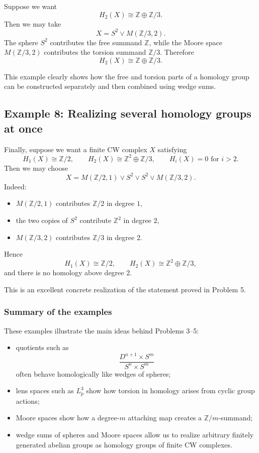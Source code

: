 \documentclass[12pt,a4paper]{article}
\theoremstyle{notespace}
\begin{document}
Suppose we want
\[
H_2(X)\cong \mathbb Z\oplus \mathbb Z/3.
\]
Then we may take
\[
X=S^2\vee M(\mathbb Z/3,2).
\]
The sphere \(S^2\) contributes the free summand \(\mathbb Z\), while the Moore space \(M(\mathbb Z/3,2)\) contributes the torsion summand \(\mathbb Z/3\). Therefore
\[
H_2(X)\cong \mathbb Z\oplus \mathbb Z/3.
\]

This example clearly shows how the free and torsion parts of a homology group can be constructed separately and then combined using wedge sums.

\subsection*{Example 8: Realizing several homology groups at once}

Finally, suppose we want a finite CW complex \(X\) satisfying
\[
H_1(X)\cong \mathbb Z/2,
\qquad
H_2(X)\cong \mathbb Z^2\oplus \mathbb Z/3,
\qquad
H_i(X)=0 \text{ for } i>2.
\]
Then we may choose
\[
X=M(\mathbb Z/2,1)\vee S^2\vee S^2\vee M(\mathbb Z/3,2).
\]
Indeed:
\begin{itemize}
	\item \(M(\mathbb Z/2,1)\) contributes \(\mathbb Z/2\) in degree \(1\),
	\item the two copies of \(S^2\) contribute \(\mathbb Z^2\) in degree \(2\),
	\item \(M(\mathbb Z/3,2)\) contributes \(\mathbb Z/3\) in degree \(2\).
\end{itemize}
Hence
\[
H_1(X)\cong \mathbb Z/2,
\qquad
H_2(X)\cong \mathbb Z^2\oplus \mathbb Z/3,
\]
and there is no homology above degree \(2\).

This is an excellent concrete realization of the statement proved in Problem 5.

\subsubsection*{Summary of the examples}

These examples illustrate the main ideas behind Problems 3--5:
\begin{itemize}
	\item quotients such as
	\[
	\frac{D^{n+1}\times S^m}{S^n\times S^m}
	\]
	often behave homologically like wedges of spheres;
	\item lens spaces such as \(L_p^3\) show how torsion in homology arises from cyclic group actions;
	\item Moore spaces show how a degree-\(m\) attaching map creates a \(\mathbb Z/m\)-summand;
	\item wedge sums of spheres and Moore spaces allow us to realize arbitrary finitely generated abelian groups as homology groups of finite CW complexes.
\end{itemize}
\end{document}
